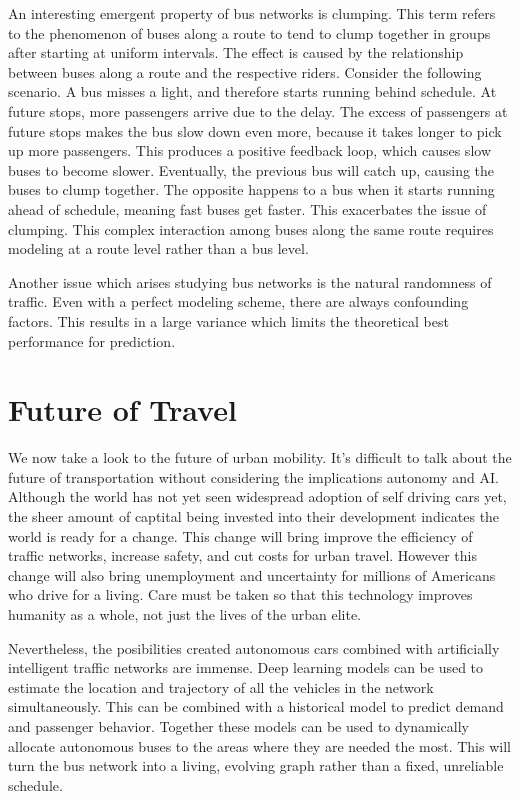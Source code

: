 
An interesting emergent property of bus networks is clumping.
This term refers to the phenomenon of buses along a route to tend to clump together in groups after starting at uniform intervals.
The effect is caused by the relationship between buses along a route and the respective riders.
Consider the following scenario.
A bus misses a light, and therefore starts running behind schedule.
At future stops, more passengers arrive due to the delay.
The excess of passengers at future stops makes the bus slow down even more, because it takes longer to pick up more passengers.
This produces a positive feedback loop, which causes slow buses to become slower.
Eventually, the previous bus will catch up, causing the buses to clump together.
The opposite happens to a bus when it starts running ahead of schedule, meaning fast buses get faster.
This exacerbates the issue of clumping.
This complex interaction among buses along the same route requires modeling at a route level rather than a bus level.


Another issue which arises studying bus networks is the natural randomness of traffic.
Even with a perfect modeling scheme, there are always confounding factors.
This results in a large variance which limits the theoretical best performance for prediction.

\section{Future of Travel}

We now take a look to the future of urban mobility.
It's difficult to talk about the future of transportation without considering the implications autonomy and AI.
Although the world has not yet seen widespread adoption of self driving cars yet, the sheer amount of captital being invested into their development indicates the world is ready for a change.
This change will bring improve the efficiency of traffic networks, increase safety, and cut costs for urban travel.
However this change will also bring unemployment and uncertainty for millions of Americans who drive for a living.
Care must be taken so that this technology improves humanity as a whole, not just the lives of the urban elite.

Nevertheless, the posibilities created autonomous cars combined with artificially intelligent traffic networks are immense.
Deep learning models can be used to estimate the location and trajectory of all the vehicles in the network simultaneously.
This can be combined with a historical model to predict demand and passenger behavior.
Together these models can be used to dynamically allocate autonomous buses to the areas where they are needed the most.
This will turn the bus network into a living, evolving graph rather than a fixed, unreliable schedule.

